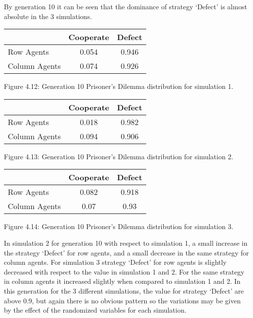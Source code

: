 \documentclass{article}
\begin{document}
By generation 10 it can be seen that the dominance of strategy `Defect'  is almost absolute in the 3 simulations.
\begin{center}
\begin{tabular}{|l|c|c|}
\hline
& Cooperate & Defect \\ 
\hline
Row Agents & 0.054 & 0.946\\
\hline
Column Agents & 0.074 & 0.926\\
\hline
\end{tabular}
\end{center}
\begin{center}
Figure 4.12: Generation 10 Prisoner’s Dilemma distribution for simulation 1.
\end{center}

\begin{center}
\begin{tabular}{|l|c|c|}
\hline
& Cooperate & Defect \\ 
\hline
Row Agents & 0.018 & 0.982\\
\hline
Column Agents & 0.094 & 0.906\\
\hline
\end{tabular}
\end{center}
\begin{center}
Figure 4.13: Generation 10 Prisoner’s Dilemma distribution for simulation 2.
\end{center}

\begin{center}
\begin{tabular}{|l|c|c|}
\hline
& Cooperate & Defect \\ 
\hline
Row Agents & 0.082 & 0.918\\
\hline
Column Agents & 0.07 & 0.93\\
\hline
\end{tabular}
\end{center}
\begin{center}
Figure 4.14: Generation 10 Prisoner’s Dilemma distribution for simulation 3.
\end{center}
In simulation 2 for generation 10  with respect to simulation 1, a small increase in the strategy `Defect'  for row agents, and a small decrease in the same strategy for column agents. For simulation 3 strategy `Defect' for row agents is slightly decreased with respect to the value in simulation 1 and 2. For the same strategy in column agents it increased slightly when compared to simulation 1 and 2.
In this generation for the 3 different simulations, the value for strategy `Defect' are above 0.9, but again there is no obvious pattern so the variations may be given by the effect of the randomized variables for each simulation.
\end{document}
